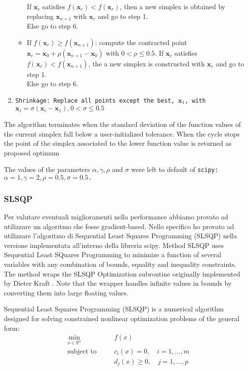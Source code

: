 \begin{enumerate}
\begin{itemize}
                If $\mathbf{x}_c$ satisfies $f(\mathbf{x}_c) < f(\mathbf{x}_{r})$, then a new simplex is obtained by replacing $\mathbf{x}_{n+1}$ with  $\mathbf{x}_c$ and go to step 1.\\
                Else go to step 6.
        \item  If $f(\mathbf{x}_r) \geq f(\mathbf{x}_{n+1})$: compute the contracted point $\mathbf{x}_c=\mathbf{x}_0 +\rho(\mathbf{x}_{n+1}-\mathbf{x}_0)$ with $0<\rho \leq 0.5$.
                If $\mathbf{x}_c$ satisfies $f(\mathbf{x}_c) < f(\mathbf{x}_{n+1})$, the a new simplex is constructed with $\mathbf{x}_c$ and go to step 1.\\
                Else go to step 6.
    \end{itemize}
    \item \tt{Shrinkage}: Replace all points except the best, $\mathbf{x}_1$, with $\mathbf{x}_i = \sigma(\mathbf{x}_i - \mathbf{x}_1), 0<\sigma \leq 0.5$  
\end{enumerate}
The algorithm terminates when the standard deviation of the function values of the current simplex fall below a user-initialized tolerance. 
When the cycle stops the point of the simplex associated to the lower function value is returned as proposed optimum

The values of the parameters $\alpha, \gamma, \rho$ and $\sigma$ were left to default of \tt{scipy}: $\alpha=1, \gamma=2, \rho=0.5, \sigma=0.5$. 

\subsubsection{SLSQP}
Per valutare eventuali miglioramenti nella performance abbiamo provato ad utilizzare un algoritmo che fosse gradient-based. 
Nello specifico ho provato ad utilizzare l'algoritmo di Sequential Least Squares Programming (SLSQP) nella versione implementata all'interno della libreria scipy.
Method SLSQP uses Sequential Least SQuares Programming to minimize a function of several variables with any combination of bounds, equality and inequality constraints. 
The method wraps the SLSQP Optimization subroutine originally implemented by Dieter Kraft \cite{kraft1988slsqp}.  
Note that the wrapper handles infinite values in bounds by converting them into large floating values.

Sequential Least Squares Programming (SLSQP) is a numerical algorithm designed for solving constrained nonlinear optimization problems of the general form:
\begin{align*}
& \min_{x \in \mathbb{R}^n} \quad && f(x) \\
& \text{subject to} \quad && c_i(x) = 0, \quad i = 1, \dots, m \\
& && d_j(x) \geq 0, \quad j = 1, \dots, p
\end{align*}

